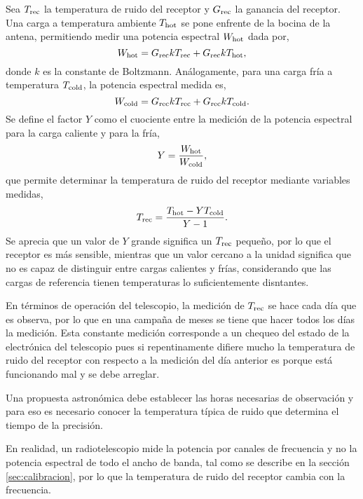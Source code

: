 Sea $T_\textnormal{rec}$ la temperatura de ruido del receptor y $G_\textnormal{rec}$ la ganancia del receptor. Una carga a temperatura ambiente $T_\textnormal{hot}$ se pone enfrente de la bocina de la antena, permitiendo medir una potencia espectral $W_\textnormal{hot}$ dada por,
\begin{equation}
W_\textnormal{hot}=G_\textnormal{rec}kT_\textnormal{rec}+G_\textnormal{rec}kT_\textnormal{hot}
,\end{equation}
donde $k$ es la constante de Boltzmann. Análogamente, para una carga fría a temperatura $T_\textnormal{cold}$, la potencia espectral medida es,
\begin{equation}
W_\textnormal{cold}=G_\textnormal{rec}kT_\textnormal{rec}+G_\textnormal{rec}kT_\textnormal{cold}
.\end{equation}
Se define el factor $Y$ como el cuociente entre la medición de la potencia espectral para la carga caliente y para la fría,
\begin{equation}
Y=\frac{W_\textnormal{hot}}{W_\textnormal{cold}}\label{eq:yfactor}
,\end{equation}
que permite determinar la temperatura de ruido del receptor mediante variables medidas,
\begin{equation}
T_\textnormal{rec}=\frac{T_\textnormal{hot}-YT_\textnormal{cold}}{Y-1}\label{eq:trec}
.\end{equation}
Se aprecia que un valor de $Y$ grande significa un $T_\textnormal{rec}$ pequeño, por lo que el receptor es más sensible, mientras que un valor cercano a la unidad significa que no es capaz de distinguir entre cargas calientes y frías, considerando que las cargas de referencia tienen temperaturas lo suficientemente disntantes.

En términos de operación del telescopio, la medición de $T_\textnormal{rec}$ se hace cada día que es observa, por lo que en una campaña de meses se tiene que hacer todos los días la medición. Esta constante medición corresponde a un chequeo del estado de la electrónica del telescopio pues si repentinamente difiere mucho la temperatura de ruido del receptor con respecto a la medición del día anterior es porque está funcionando mal y se debe arreglar.

Una propuesta astronómica debe establecer las horas necesarias de observación y para eso es necesario conocer la temperatura típica de ruido que determina el tiempo de la precisión.

En realidad, un radiotelescopio mide la potencia por canales de frecuencia y no la potencia espectral de todo el ancho de banda, tal como se describe en la sección \ref{sec:calibracion}, por lo que la temperatura de ruido del receptor cambia con la frecuencia.

